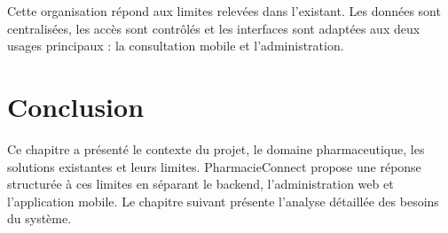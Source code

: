 Cette organisation répond aux limites relevées dans l'existant. Les données sont centralisées, les accès
sont contrôlés et les interfaces sont adaptées aux deux usages principaux : la consultation mobile et
l'administration.

\section{Conclusion}

Ce chapitre a présenté le contexte du projet, le domaine pharmaceutique, les solutions existantes et leurs
limites. PharmacieConnect propose une réponse structurée à ces limites en séparant le backend,
l'administration web et l'application mobile. Le chapitre suivant présente l'analyse détaillée des besoins
du système.
